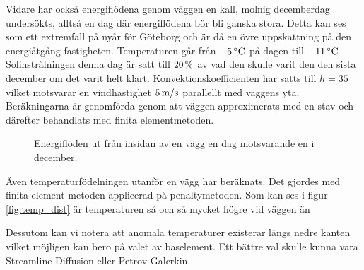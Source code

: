 Vidare har också energiflödena genom väggen en kall, molnig decemberdag undersökts, alltså en dag där energiflödena bör bli ganska stora. Detta kan ses som ett extremfall på nyår för Göteborg och är då en övre uppskattning på den energiåtgång fastigheten.
 Temperaturen går från $\unit[-5]{^\circ C}$ på dagen till $\unit[-11]{^\circ C}$ Solinstrålningen denna dag är satt till $\unit[20]{\%}$ av vad den skulle varit den den sista december om det varit helt klart. Konvektionskoefficienten har satts till $h=35$ vilket motsvarar en vindhastighet $\unit[5]{m/s}$ parallellt med väggens yta. Beräkningarna är genomförda genom att väggen approximerats med en stav och därefter behandlats med
finita elementmetoden.


\begin{figure}[hpbt]
\centering
{}\vspace{1cm}
\caption{Energiflöden ut från insidan av en vägg en dag motsvarande en i december.
}
\end{figure}


Även temperaturfödelningen utanför en vägg har beräknats. Det gjordes med finita element metoden applicerad på penaltymetoden. Som kan ses i figur \ref{fig:temp_dist} är temperaturen så och så mycket högre vid väggen än %

Dessutom kan vi notera att anomala temperaturer existerar längs nedre kanten vilket möjligen kan bero på valet av baselement. Ett bättre val skulle kunna vara Streamline-Diffusion eller Petrov Galerkin.

